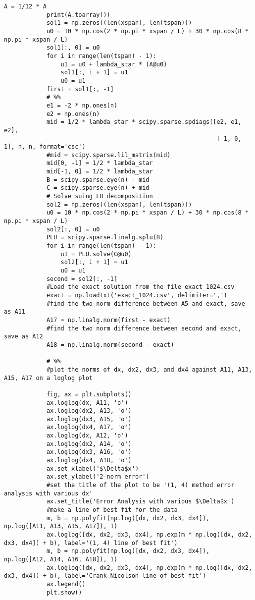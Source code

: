 \documentclass[a4paper,12pt, fleqn]{article}
\begin{document}
\begin{enumerate}
\begin{lstlisting}[basicstyle=\tiny]
            A = 1/12 * A
            print(A.toarray())
            sol1 = np.zeros((len(xspan), len(tspan)))
            u0 = 10 * np.cos(2 * np.pi * xspan / L) + 30 * np.cos(8 * np.pi * xspan / L)
            sol1[:, 0] = u0
            for i in range(len(tspan) - 1):
                u1 = u0 + lambda_star * (A@u0)
                sol1[:, i + 1] = u1 
                u0 = u1
            first = sol1[:, -1]
            # %%
            e1 = -2 * np.ones(n)
            e2 = np.ones(n)
            mid = 1/2 * lambda_star * scipy.sparse.spdiags([e2, e1, e2],
                                                            [-1, 0, 1], n, n, format='csc')
            #mid = scipy.sparse.lil_matrix(mid)
            mid[0, -1] = 1/2 * lambda_star
            mid[-1, 0] = 1/2 * lambda_star
            B = scipy.sparse.eye(n) - mid
            C = scipy.sparse.eye(n) + mid
            # Solve suing LU decomposition
            sol2 = np.zeros((len(xspan), len(tspan)))
            u0 = 10 * np.cos(2 * np.pi * xspan / L) + 30 * np.cos(8 * np.pi * xspan / L)
            sol2[:, 0] = u0
            PLU = scipy.sparse.linalg.splu(B)
            for i in range(len(tspan) - 1):
                u1 = PLU.solve(C@u0)
                sol2[:, i + 1] = u1
                u0 = u1
            second = sol2[:, -1]
            #Load the exact solution from the file exact_1024.csv
            exact = np.loadtxt('exact_1024.csv', delimiter=',')
            #find the two norm difference between A5 and exact, save as A11
            A17 = np.linalg.norm(first - exact)
            #find the two norm difference between second and exact, save as A12
            A18 = np.linalg.norm(second - exact)

            # %%
            #plot the norms of dx, dx2, dx3, and dx4 against A11, A13, A15, A17 on a loglog plot

            fig, ax = plt.subplots()
            ax.loglog(dx, A11, 'o')
            ax.loglog(dx2, A13, 'o')
            ax.loglog(dx3, A15, 'o')
            ax.loglog(dx4, A17, 'o')
            ax.loglog(dx, A12, 'o')
            ax.loglog(dx2, A14, 'o')
            ax.loglog(dx3, A16, 'o')
            ax.loglog(dx4, A18, 'o')
            ax.set_xlabel('$\Delta$x')
            ax.set_ylabel('2-norm error')
            #set the title of the plot to be '(1, 4) method error analysis with various dx'
            ax.set_title('Error Analysis with various $\Delta$x')
            #make a line of best fit for the data
            m, b = np.polyfit(np.log([dx, dx2, dx3, dx4]), np.log([A11, A13, A15, A17]), 1)
            ax.loglog([dx, dx2, dx3, dx4], np.exp(m * np.log([dx, dx2, dx3, dx4]) + b), label='(1, 4) line of best fit')
            m, b = np.polyfit(np.log([dx, dx2, dx3, dx4]), np.log([A12, A14, A16, A18]), 1)
            ax.loglog([dx, dx2, dx3, dx4], np.exp(m * np.log([dx, dx2, dx3, dx4]) + b), label='Crank-Nicolson line of best fit')
            ax.legend()
            plt.show()


\end{lstlisting}
\end{enumerate}
\end{document}
